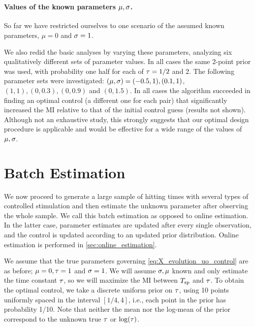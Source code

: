\documentclass[12pt]{article}
\begin{document}
\

\paragraph{Values of the known parameters $\mu, {\sigma }$.} 
So far we have restricted ourselves to one scenario of the assumed known
parameters, $\mu=0$ and ${\sigma }=1$. 

We also redid the basic analyses by varying these parameters, analyzing six
qualitatively different sets of parameter values. In all cases the same 2-point
prior was used, with probability one half for each of ${ \tau } = 1/2$ and $2$. The following
parameter sets were investigated: $(\mu,{\sigma })=(-0.5, 1), (0.1,1)$, $(1,1), (0, 
0.3), (0, 0.9)$ and $(0,1.5)$. In all cases the algorithm succeeded in finding
an optimal control (a different one for each pair) that significantly increased the
MI relative to that of the initial control guess (results not
shown). Although not an exhaustive study, this strongly suggests that our
optimal design procedure is applicable and would be effective for a wide range
of the values of ${\mu },{\sigma }$.  


\section{Batch Estimation}
\label{sec:batch_estimation}
We now proceed to generate a large sample of hitting times with several types
of controlled stimulation and then estimate the unknown
parameter after observing the whole sample. We call this batch estimation as opposed to
online estimation.
In the latter case, parameter estimates are updated after every single
observation, and the control is updated according to an updated prior
distribution.
Online estimation is performed in \cref{sec:online_estimation}.
 
We assume that the true parameters governing \cref{eq:X_evolution_uo_control}
are as before; $ {\mu } = 0, { \tau } = 1$ and $ {\sigma } = 1$. We will assume ${\sigma }, {\mu }$
known and only estimate the time constant ${ \tau }$, so
we will maximize the MI between ${ T_{\textrm{sp} } }$ and ${ \tau }$. To
obtain the optimal control, we take a discrete uniform prior on 
 ${ \tau }$, using 10 points uniformly spaced in the interval $[1/4, 4]$, i.e.,
 each point in the prior has probability 1/10. Note that neither the mean nor the
 log-mean of the prior correspond to the unknown true ${ \tau }$ or $\log({ \tau })$.
 
\end{document}
